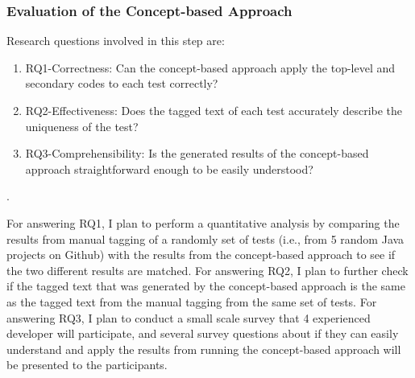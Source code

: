 \subsubsection{Evaluation of the Concept-based Approach}

Research questions involved in this step are:
%
\begin{enumerate}
    \item RQ1-Correctness: Can the concept-based approach apply the top-level and secondary codes to each test correctly?
    \item RQ2-Effectiveness: Does the tagged text of each test accurately describe the uniqueness of the test?
    \item RQ3-Comprehensibility: Is the generated results of the concept-based approach straightforward enough to be easily understood?
\end{enumerate}.

For answering RQ1, I plan to perform a quantitative analysis by comparing the results from manual tagging of a randomly set of tests (i.e., from 5 random Java projects on Github) with the results from the concept-based approach to see if the two different results are matched.
%
For answering RQ2, I plan to further check if the tagged text that was generated by the concept-based approach is the same as the tagged text from the manual tagging from the same set of tests.
%
For answering RQ3, I plan to conduct a small scale survey that 4 experienced developer will participate, and several survey questions about if they can easily understand and apply the results from running the concept-based approach will be presented to the participants.


